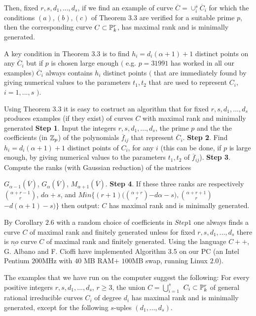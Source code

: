 Then, fixed $r,s,d_1,...,d_s$, if we find an example of curve 
$\overline C=\cup_i^s \overline C_i$ 
for which the conditions $(a),(b),(c)$
of Theorem 3.3 are verified
 for a suitable prime $p$, then the corresponding curve
$C\subset\Bbb P_k^r$, 
 has maximal rank and
is minimally generated.

 A key condition in Theorem $3.3$ is to find 
$h_i=d_i(\alpha+1)+1$ distinct points on any $\overline C_i$ but 
if $p$ is chosen large enough $($ e.g. $p=31991$ has worked in all our
examples$)$ 
$\overline C_i$ always contains $h_i$ distinct points $($ that are 
immediately found by giving
numerical values to the parameters $t_1,t_2$ that are used to represent
$C_i$,
 $i=1,...,s$ $)$.\endproclaim 

 Using Theorem 3.3 it is easy to costruct an algorithm that for fixed
$r,s,d_1,...,d_s$  produces examples (if they exist)
of curves $C$  with maximal rank and minimally generated 
\medskip
{\bf Step 1}. Input the integers $r,s,d_1,...,d_s$, the prime $p$ and the
 the coefficients (in $\Bbb Z_p$)  of the polynomials 
$\overline f_{ij}$ that represent $\overline C_i$.
\medskip
{\bf Step 2}. Find $h_i=d_i(\alpha+1)+1$ distinct points of $C_i$, for any
$i$
 (this can
be done, if $p$ is large enough, by giving numerical values to the
parameters
 $t_1,t_2$ of $\overline f_{ij}$).\medskip
{\bf Step 3}. Compute the ranks (with Gaussian reduction) of the matrices

$G_{\alpha-1}(\overline V)$,
 $G_\alpha(\overline V)$,
 $M_{\alpha+1}(\overline V)$.\medskip
{\bf Step 4}. If these three ranks are respectively
$ $$\alpha+r-1\choose r$$ $,
$  d\alpha+s $, and  
$Min\{(r+1)($$\alpha+r\choose r$$-d\alpha-s), 
$$\alpha+r+1\choose r$$-d(\alpha+1)-s)\}$ then output:
 $C$ has maximal rank and is minimally generated.
 
 
\endproclaim
{} By Corollary $2.6$ with a random choice of
coefficients in 
 $Step 1$ one always finds
a curve $C$ of maximal rank and finitely generated unless for fixed
$r,s,d_1,...,d_s$ there is $\underline {no}$ curve
 $C$ of maximal rank and finitely generated.\endproclaim
Using the language $C++$, G. Albano and F. Cioffi have implemented
Algorithm 3.5 
on our PC 
(an Intel Pentium $200$MHz with $40$ MB RAM$+$ $100$MB swap,
running Linux $2.0$).

The examples that we have run on the computer suggest the following: 
For every positive integers $r,s,d_1,...,d_s$, $r\geq 3$, 
the union $C=$$\bigcup_{i=1}^s$ $ C_i  \subset \Bbb P_k^r$ 
of  general rational irreducible  curves $C_i$ of degree $d_i$ has maximal
rank
and is minimally generated, 
 except for the following $s$-uples $(d_1,...,d_s)$.\medskip

